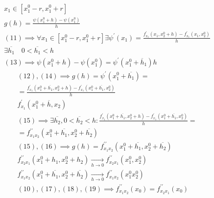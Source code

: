 \documentclass[main]{subfiles}
\begin{document}
\begin{longProof}
\begin{gather*}
            \end{gather*}
            \begin{gather*}
                x_1 \in [x_1^0-r,x_1^0+r] \\
                g(h) = \frac{\psi(x^0_1+h)-\psi(x_1^0)}{h} \tag{12}\\
                (11) \implies \forall x_1 \in [x_1^0-r,x_1^0+r] \exists \psi^\prime(x_1) =
                \frac{f^\prime_{x_1}(x_1,x_2^0+h)-f^\prime_{x_1}(x_1,x_2^0)}{h} \tag{13}\\
                \exists \overline{h_1} \quad 0 < \overline{h_1} < h \\
                (13) \implies \psi (x_1^0+h) - \psi(x_1^0) = \psi^\prime(x_1^0+\overline{h}_1)h \tag{14}
            \end{gather*}
            \begin{gather*}
                (12),(14) \implies g(h) = \psi^\prime(x_1^0 + \overline{h_1}) = \\ =
                 \frac{f^\prime_{x_1}(x_1^0+\overline{h_1},x_2^0+h)-f^\prime_{x_1}(x_1^0+\overline{h_1},x_2^0)}{h} \tag{15}\\
                f^\prime_{x_1}(x_1^0 + \overline{h}, x_2) \\
                (15) \implies \exists \overline{h_2}, 0 < \overline{h_2} < h : 
                \frac{f^\prime_{x_1}(x_1^0 + \overline{h_1}, x_2^0 + h) - f^\prime_{x_1}(x_1^0 + \overline{h_1}, x_2^0)}{h} = \\
               = f^{\prime\prime}_{x_1 x_2}(x_1^0 + \overline{h_1}, x_2^0 + \overline{h_2}) \tag{16} \\
                (15),(16) \implies g(h) = f^{\prime\prime}_{x_1x_2}(x_1^0+ \overline{h_1}, x_2^0 + \overline{h_2}) \tag{17}\\
                f^{\prime\prime}_{x_2x_1}(x_1^0+ h_1, x_2^0 + h_2) \underset{h \to 0}{\rightarrow} f^{\prime\prime}_{x_2x_1}(x_1^0, x_2^0) \tag{18}\\
            f^{\prime\prime}_{x_1x_2}(x_1^0+ \overline{h_1}, x_2^0 + \overline{h_2}) \underset{h \to 0}{\rightarrow} f^{\prime\prime}_{x_1x_2}(x_1^0x_2^0) \tag{19}\\
            (10), (17), (18), (19) \implies f^{\prime\prime}_{x_1x_2}(x_0) = f^{\prime\prime}_{x_2x_1}(x_0)
            \end{gather*}
        \end{longProof}
\end{document}
